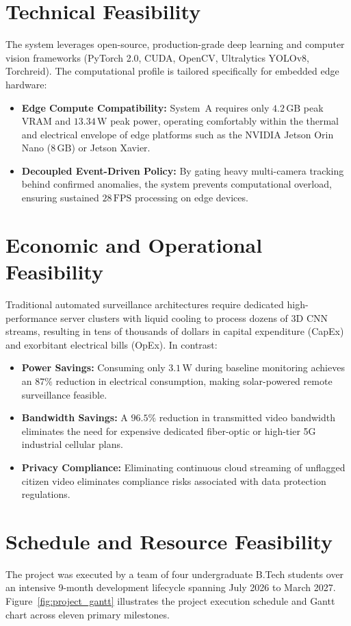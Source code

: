 \documentclass[12pt,a4paper]{report}
\begin{document}
\section{Technical Feasibility}
The system leverages open-source, production-grade deep learning and computer vision frameworks (PyTorch 2.0, CUDA, OpenCV, Ultralytics YOLOv8, Torchreid). The computational profile is tailored specifically for embedded edge hardware:
\begin{itemize}
    \item \textbf{Edge Compute Compatibility:} System~A requires only $4.2\,\text{GB}$ peak VRAM and $13.34\,\text{W}$ peak power, operating comfortably within the thermal and electrical envelope of edge platforms such as the NVIDIA Jetson Orin Nano ($8\,\text{GB}$) or Jetson Xavier.
    \item \textbf{Decoupled Event-Driven Policy:} By gating heavy multi-camera tracking behind confirmed anomalies, the system prevents computational overload, ensuring sustained $28\,\text{FPS}$ processing on edge devices.
\end{itemize}

\section{Economic and Operational Feasibility}
Traditional automated surveillance architectures require dedicated high-performance server clusters with liquid cooling to process dozens of 3D CNN streams, resulting in tens of thousands of dollars in capital expenditure (CapEx) and exorbitant electrical bills (OpEx). In contrast:
\begin{itemize}
    \item \textbf{Power Savings:} Consuming only $3.1\,\text{W}$ during baseline monitoring achieves an $87\%$ reduction in electrical consumption, making solar-powered remote surveillance feasible.
    \item \textbf{Bandwidth Savings:} A $96.5\%$ reduction in transmitted video bandwidth eliminates the need for expensive dedicated fiber-optic or high-tier 5G industrial cellular plans.
    \item \textbf{Privacy Compliance:} Eliminating continuous cloud streaming of unflagged citizen video eliminates compliance risks associated with data protection regulations.
\end{itemize}

\section{Schedule and Resource Feasibility}
The project was executed by a team of four undergraduate B.Tech students over an intensive 9-month development lifecycle spanning July 2026 to March 2027. Figure~\ref{fig:project_gantt} illustrates the project execution schedule and Gantt chart across eleven primary milestones.
\end{document}
